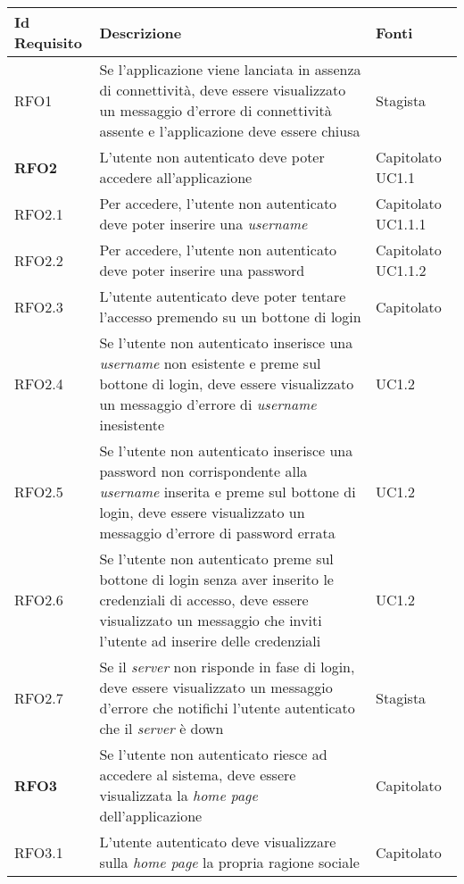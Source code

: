 {\renewcommand{\arraystretch}{2}
\begin{center}
\begin{longtable}{ | >{\centering\arraybackslash}p{2.5cm} | >{\arraybackslash}p{7cm} | >{\centering\arraybackslash}p{2cm} | }
        
\hline
\textbf{Id Requisito} & \textbf{Descrizione} & \textbf{Fonti} \\ \hline
\endhead
RFO1 & Se l'applicazione viene lanciata in assenza di connettività, deve essere visualizzato un messaggio d'errore di connettività assente e l'applicazione deve essere chiusa & Stagista \\ \hline
\textbf{RFO2} & L'utente non autenticato deve poter accedere all'applicazione & Capitolato UC1.1 \\ \hline
RFO2.1 & Per accedere, l'utente non autenticato deve poter inserire una \textit{username} & Capitolato UC1.1.1 \\ \hline
RFO2.2 & Per accedere, l'utente non autenticato deve poter inserire una password & Capitolato UC1.1.2 \\ \hline
RFO2.3 & L'utente autenticato deve poter tentare l'accesso premendo su un bottone di login & Capitolato\\ \hline
RFO2.4 & Se l'utente non autenticato inserisce una \textit{username} non esistente e preme sul bottone di login, deve essere visualizzato un messaggio d'errore di \textit{username} inesistente & UC1.2 \\ \hline
RFO2.5 & Se l'utente non autenticato inserisce una password non corrispondente alla \textit{username} inserita e preme sul bottone di login, deve essere visualizzato un messaggio d'errore di password errata & UC1.2 \\ \hline
RFO2.6 & Se l'utente non autenticato preme sul bottone di login senza aver inserito le credenziali di accesso, deve essere visualizzato un messaggio che inviti l'utente ad inserire delle credenziali & UC1.2 \\ \hline
RFO2.7 & Se il \textit{server} non risponde in fase di login, deve essere visualizzato un messaggio d'errore che notifichi l'utente autenticato che il \textit{server} è down & Stagista \\ \hline
\textbf{RFO3} & Se l'utente non autenticato riesce ad accedere al sistema, deve essere visualizzata la \textit{home page} dell'applicazione & Capitolato \\ \hline
RFO3.1 & L'utente autenticato deve visualizzare sulla \textit{home page} la propria ragione sociale & Capitolato \\ \hline

\end{longtable}
\end{center}}
